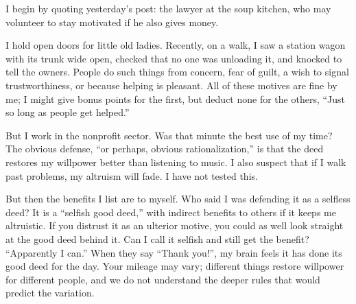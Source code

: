 
I begin by quoting yesterday's post: the lawyer at the soup kitchen, who may volunteer to stay motivated if he also gives money.

I hold open doors for little old ladies. Recently, on a walk, I saw a station wagon with its trunk wide open, checked that no one was unloading it, and knocked to tell the owners. People do such things from concern, fear of guilt, a wish to signal trustworthiness, or because helping is pleasant. All of these motives are fine by me; I might give bonus points for the first, but deduct none for the others, ``Just so long as people get helped.'' 

But I work in the nonprofit sector. Was that minute the best use of my time? The obvious defense, ``or perhaps, obvious rationalization,'' is that the deed restores my willpower better than listening to music. I also suspect that if I walk past problems, my altruism will fade. I have not tested this. 

But then the benefits I list are to myself. Who said I was defending it as a selfless deed? It is a ``selfish good deed,'' with indirect benefits to others if it keeps me altruistic. If you distrust it as an ulterior motive, you could as well look straight at the good deed behind it.  Can I call it selfish and still get the benefit? ``Apparently I can.'' When they say ``Thank you!'', my brain feels it has done its good deed for the day. Your mileage may vary; different things restore willpower for different people, and we do not understand the deeper rules that would predict the variation.

